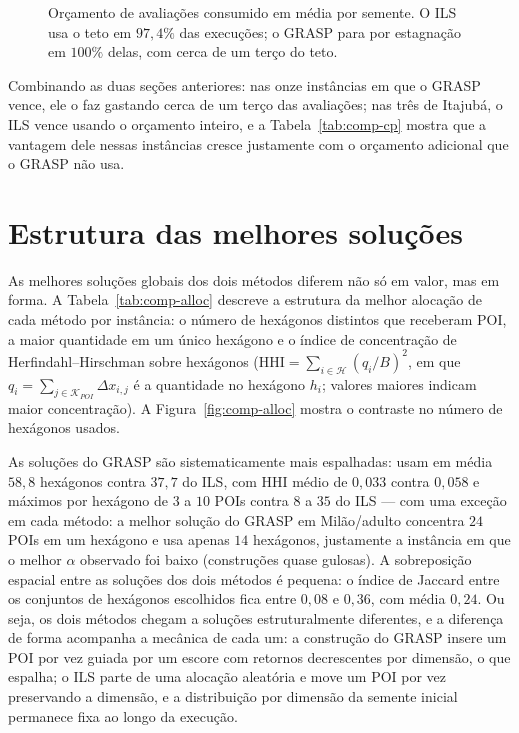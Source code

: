 \documentclass[11pt,a4paper]{article}
\begin{document}
\begin{figure}[htbp]
\centering
{}
\caption{Orçamento de avaliações consumido em média por semente. O ILS usa o teto em $97{,}4\%$ das execuções; o GRASP para por estagnação em $100\%$ delas, com cerca de um terço do teto.}
\label{fig:comp-orc}
\end{figure}

Combinando as duas seções anteriores: nas onze instâncias em que o GRASP vence, ele o faz gastando cerca de um terço das avaliações; nas três de Itajubá, o ILS vence usando o orçamento inteiro, e a Tabela~\ref{tab:comp-cp} mostra que a vantagem dele nessas instâncias cresce justamente com o orçamento adicional que o GRASP não usa.

\section{Estrutura das melhores soluções}
\label{sec:comp-solucoes}

As melhores soluções globais dos dois métodos diferem não só em valor, mas em forma. A Tabela~\ref{tab:comp-alloc} descreve a estrutura da melhor alocação de cada método por instância: o número de hexágonos distintos que receberam POI, a maior quantidade em um único hexágono e o índice de concentração de Herfindahl--Hirschman sobre hexágonos ($\mathrm{HHI} = \sum_{i \in \mathcal{H}} (q_i/B)^2$, em que $q_i = \sum_{j \in \mathcal{K}_{POI}} \Delta x_{i,j}$ é a quantidade no hexágono $h_i$; valores maiores indicam maior concentração). A Figura~\ref{fig:comp-alloc} mostra o contraste no número de hexágonos usados.

As soluções do GRASP são sistematicamente mais espalhadas: usam em média $58{,}8$ hexágonos contra $37{,}7$ do ILS, com HHI médio de $0{,}033$ contra $0{,}058$ e máximos por hexágono de $3$ a $10$ POIs contra $8$ a $35$ do ILS — com uma exceção em cada método: a melhor solução do GRASP em Milão/adulto concentra $24$ POIs em um hexágono e usa apenas $14$ hexágonos, justamente a instância em que o melhor $\alpha$ observado foi baixo (construções quase gulosas). A sobreposição espacial entre as soluções dos dois métodos é pequena: o índice de Jaccard entre os conjuntos de hexágonos escolhidos fica entre $0{,}08$ e $0{,}36$, com média $0{,}24$. Ou seja, os dois métodos chegam a soluções estruturalmente diferentes, e a diferença de forma acompanha a mecânica de cada um: a construção do GRASP insere um POI por vez guiada por um escore com retornos decrescentes por dimensão, o que espalha; o ILS parte de uma alocação aleatória e move um POI por vez preservando a dimensão, e a distribuição por dimensão da semente inicial permanece fixa ao longo da execução.
\end{document}
